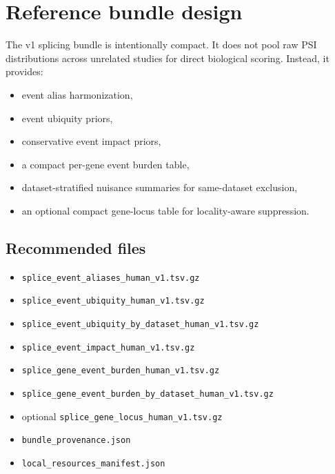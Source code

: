 \documentclass[11pt]{article}
\begin{document}
\section{Reference bundle design}
The v1 splicing bundle is intentionally compact. It does not pool raw PSI distributions across unrelated studies for direct biological scoring. Instead, it provides:
\begin{itemize}[leftmargin=2em]
\item event alias harmonization,
\item event ubiquity priors,
\item conservative event impact priors,
\item a compact per-gene event burden table,
\item dataset-stratified nuisance summaries for same-dataset exclusion,
\item an optional compact gene-locus table for locality-aware suppression.
\end{itemize}

\subsection{Recommended files}
\begin{itemize}[leftmargin=2em]
\item \texttt{splice\_event\_aliases\_human\_v1.tsv.gz}
\item \texttt{splice\_event\_ubiquity\_human\_v1.tsv.gz}
\item \texttt{splice\_event\_ubiquity\_by\_dataset\_human\_v1.tsv.gz}
\item \texttt{splice\_event\_impact\_human\_v1.tsv.gz}
\item \texttt{splice\_gene\_event\_burden\_human\_v1.tsv.gz}
\item \texttt{splice\_gene\_event\_burden\_by\_dataset\_human\_v1.tsv.gz}
\item optional \texttt{splice\_gene\_locus\_human\_v1.tsv.gz}
\item \texttt{bundle\_provenance.json}
\item \texttt{local\_resources\_manifest.json}
\end{itemize}
\end{document}
